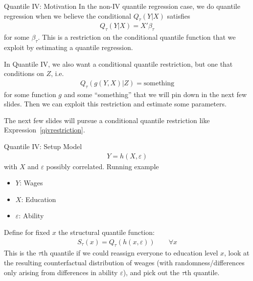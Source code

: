 \documentclass[handout]{beamer}
\begin{document}
\begin{frame}[shrink]{Quantile IV: Motivation}
In the non-IV quantile regression case, we do quantile regression when
we believe the conditional $Q_\tau(Y|X)$ satisfies
\begin{align*}
  Q_\tau(Y|X)=X'\beta_\tau
\end{align*}
for some $\beta_\tau$.
This is a restriction on the conditional quantile function that we
exploit by estimating a quantile regression.

In Quantile IV, we also want a conditional quantile restriction, but one
that conditions on $Z$, i.e.
\begin{align}
  Q_\tau(g(Y,X)|Z)=\text{something}
  \label{qivrestriction}
\end{align}
for some function $g$ and some ``something'' that we will pin down in
the next few slides.
Then we can exploit this restriction and estimate some parameters.

The next few slides will pursue a conditional quantile restriction like
Expression~\ref{qivrestriction}.
\end{frame}

\begin{frame}[shrink]{Quantile IV: Setup}
Model
\begin{align*}
  Y = h(X,\varepsilon)
\end{align*}
with $X$ and $\varepsilon$ possibly correlated.
Running example
\begin{itemize}
  \item $Y$: Wages
  \item $X$: Education
  \item $\varepsilon$: Ability
\end{itemize}
Define for fixed $x$ the
\alert{structural quantile function}:
\begin{align*}
  S_\tau(x) = Q_\tau(h(x,\varepsilon))
  \qquad
  \forall x
\end{align*}
This is the $\tau$th quantile if we could reassign \alert{everyone} to
education level $x$, look at the resulting \alert{counterfactual}
distribution of weages (with randomness/differences only arising from
differences in ability $\varepsilon$), and pick out the $\tau$th
quantile.
\end{frame}
\end{document}
